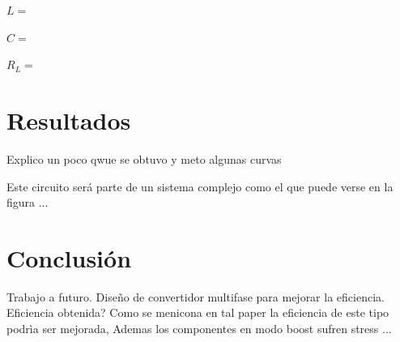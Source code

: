     $L = $
    
    $C = $
    
    $R_L = $
    
    

\section{Resultados}
 
    Explico un poco qwue se obtuvo y meto algunas curvas 
    
    Este circuito será parte de un sistema complejo como el que puede verse en la figura ... 
 
\section{Conclusión}

Trabajo a futuro. Diseño de convertidor multifase para mejorar la eficiencia. 
Eficiencia obtenida? 
Como se menicona en tal paper la eficiencia de este tipo podrìa ser mejorada, Ademas los componentes en modo boost sufren stress ... 




\nocite{*}





